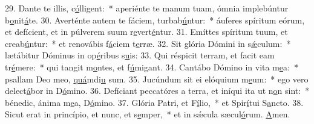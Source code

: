 29. Dante te illis, c\uline{ó}lligent:~* aperiénte te manum tuam, ómnia implebúntur b\uline{o}nit\uline{á}te.
30. Averténte autem te fáciem, turbab\uline{ú}ntur:~* áuferes spíritum eórum, et defícient, et in púlverem suum r\uline{e}vert\uline{é}ntur.
31. Emíttes spíritum tuum, et creab\uline{ú}ntur:~* et renovábis f\uline{á}ciem t\uline{e}rræ.
32. Sit glória Dómini in s\uline{ǽ}culum:~* lætábitur Dóminus in op\uline{é}ribus s\uline{u}is:
33. Qui réspicit terram, et facit eam tr\uline{é}mere:~* qui tangit m\uline{o}ntes, et f\uline{ú}migant.
34. Cantábo Dómino in vita m\uline{e}a:~* psallam Deo meo, \uline{quá}mdi\uline{u} sum.
35. Jucúndum sit ei elóquium m\uline{e}um:~* ego vero delect\uline{á}bor in D\uline{ó}mino.
36. Defíciant peccatóres a terra, et iníqui ita ut n\uline{o}n sint:~* bénedic, ánima m\uline{e}a, D\uline{ó}mino.
37. Glória Patri, et F\uline{í}lio,~* et Spir\uline{í}tui S\uline{a}ncto.
38. Sicut erat in princípio, et nunc, et s\uline{e}mper,~* et in sǽcula sæcul\uline{ó}rum. \uline{A}men.
